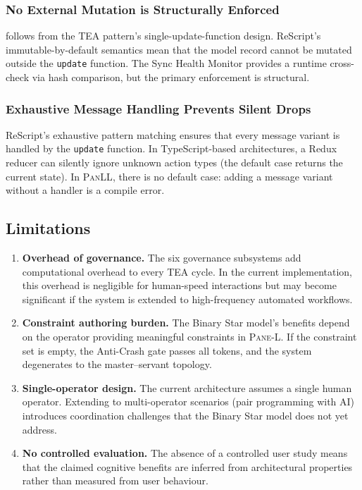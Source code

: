 \documentclass[11pt,a4paper]{article}
\newcommand{\paneL}{\textsc{Pane-L}}
\newcommand{\panll}{\textsc{PanLL}}
\newcommand{\tea}{\textsc{TEA}}
\begin{document}
\subsubsection{No External Mutation is Structurally Enforced}

 follows from the \tea{} pattern's
single-update-function design. ReScript's immutable-by-default
semantics mean that the model record cannot be mutated outside
the \texttt{update} function. The Sync Health Monitor provides
a runtime cross-check via hash comparison, but the primary
enforcement is structural.

\subsubsection{Exhaustive Message Handling Prevents Silent Drops}

ReScript's exhaustive pattern matching ensures that every message
variant is handled by the \texttt{update} function. In TypeScript-based
architectures, a Redux reducer can silently ignore unknown action
types (the default case returns the current state). In \panll{},
there is no default case: adding a message variant without a handler
is a compile error.

\subsection{Limitations}

\begin{enumerate}
  \item \textbf{Overhead of governance.} The six governance subsystems
    add computational overhead to every \tea{} cycle. In the current
    implementation, this overhead is negligible for human-speed
    interactions but may become significant if the system is extended
    to high-frequency automated workflows.
  \item \textbf{Constraint authoring burden.} The Binary Star model's
    benefits depend on the operator providing meaningful constraints
    in \paneL{}. If the constraint set is empty, the Anti-Crash gate
    passes all tokens, and the system degenerates to the
    master--servant topology.
  \item \textbf{Single-operator design.} The current architecture
    assumes a single human operator. Extending to multi-operator
    scenarios (pair programming with AI) introduces coordination
    challenges that the Binary Star model does not yet address.
  \item \textbf{No controlled evaluation.} The absence of a
    controlled user study means that the claimed cognitive benefits
    are inferred from architectural properties rather than measured
    from user behaviour.
\end{enumerate}
\end{document}
